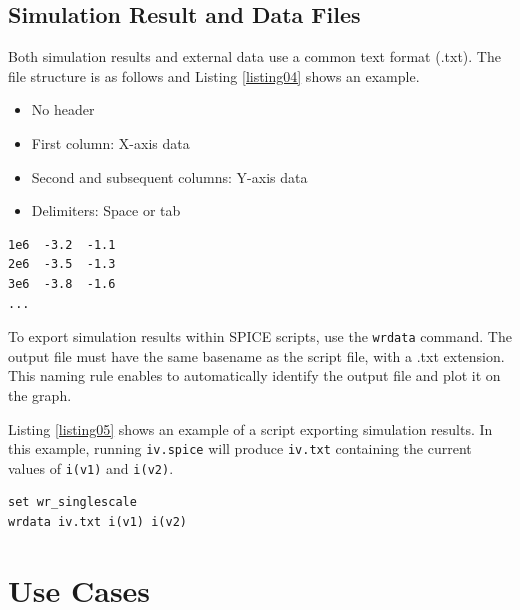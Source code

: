 \documentclass[a4paper,12pt,titlepage]{article}
\begin{document}
\subsection{Simulation Result and Data Files}

Both simulation results and external data use a common text format (.txt). The file structure is as
follows and Listing \ref{listing04} shows an example.

\begin{itemize}
    \setlength{\parskip}{0mm}
    \setlength{\itemsep}{0mm}
    \item No header
    \item First column: X-axis data
    \item Second and subsequent columns: Y-axis data
    \item Delimiters: Space or tab
\end{itemize}

\begin{lstlisting}[label=listing04,caption=Example of a data file]
1e6  -3.2  -1.1
2e6  -3.5  -1.3
3e6  -3.8  -1.6
...
\end{lstlisting}

To export simulation results within SPICE scripts, use the \texttt{wrdata} command. The output file
must have the same basename as the script file, with a .txt extension. This naming rule enables to
automatically identify the output file and plot it on the graph.

Listing \ref{listing05} shows an example of a script exporting simulation results. In this example,
running \texttt{iv.spice} will produce \texttt{iv.txt} containing the current values of
\texttt{i(v1)} and \texttt{i(v2)}.

\begin{lstlisting}[label=listing05,caption=SPICE script exporting simulation results]
set wr_singlescale
wrdata iv.txt i(v1) i(v2)
\end{lstlisting}

\section{Use Cases}
\end{document}
